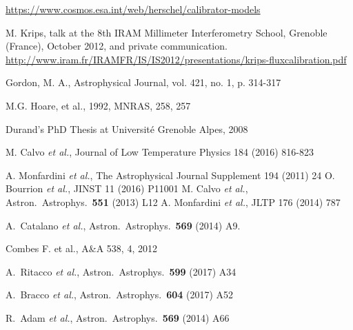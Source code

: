 \begin{thebibliography}{99}
\url{https://www.cosmos.esa.int/web/herschel/calibrator-models}

 M. Krips, talk at the 8th 
IRAM Millimeter Interferometry School, Grenoble (France),  October 2012, and
private communication.\\
\url{http://www.iram.fr/IRAMFR/IS/IS2012/presentations/krips-fluxcalibration.pdf}

 Gordon, M. A., Astrophysical Journal, vol. 421, no. 1, p. 314-317

 M.G. Hoare, et al., 1992, MNRAS, 258, 257

 Durand's PhD Thesis at
Universit\'e Grenoble Alpes, 2008


M. Calvo {\it et al.},  
Journal of Low Temperature Physics 184 (2016) 816-823 
 
    A. Monfardini {\it et al.}, The Astrophysical Journal Supplement 194 (2011)  24 
    O. Bourrion {\it et al.}, JINST 11 (2016) P11001 
    M. Calvo {\it et al.}, Astron.\ Astrophys.\  {\bf 551} (2013) L12
 A. Monfardini {\it et al.}, JLTP 176 (2014) 787
    
 
  A.~Catalano {\it et al.},
  Astron.\ Astrophys.\  {\bf 569} (2014) A9.
  
 Combes F. et al., A\&A 538, 4, 2012
  
 
  A.~Ritacco {\it et al.},
  Astron.\ Astrophys.\  {\bf 599} (2017) A34
  
  A.~Bracco {\it et al.},
  Astron.\ Astrophys.\  {\bf 604} (2017) A52


  R.~Adam {\it et al.},
  Astron.\ Astrophys.\  {\bf 569} (2014) A66
  


\end{thebibliography}

